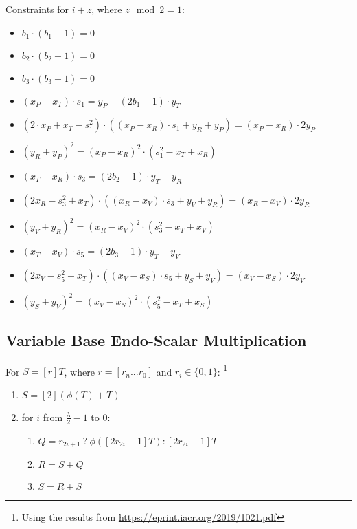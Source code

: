 Constraints for $i + z$, where $z\mod 2 = 1$:
\begin{itemize}
	\item $b_1 \cdot (b_1 - 1) = 0$
	\item $b_2 \cdot (b_2 - 1) = 0$
	\item $b_3 \cdot (b_3 - 1) = 0$
	\item $(x_P - x_T) \cdot s_1 = y_P - (2b_1 - 1) \cdot y_T$
	\item $(2 \cdot x_P + x_T - s_1^2) \cdot ((x_P - x_R) \cdot s_1 + y_R + y_P) = (x_P - x_R) \cdot 2y_P$\
	\item $(y_R + y_P)^2 = (x_P - x_R)^2 \cdot (s_1^2 - x_T + x_R)$
	\item $(x_T - x_R) \cdot s_3 = (2b_2 - 1) \cdot y_T - y_R$
	\item $(2x_R - s_3^2 + x_T) \cdot ((x_R - x_V) \cdot s_3 + y_V + y_R) = (x_R - x_V) \cdot 2y_R$
	\item $(y_V + y_R)^2 = (x_R - x_V)^2 \cdot (s_3^2 - x_T + x_V)$
	\item $(x_T - x_V) \cdot s_5 = (2b_3 - 1) \cdot y_T - y_V$
	\item $(2x_V - s_5^2 + x_T) \cdot ((x_V - x_S) \cdot s_5 + y_S + y_V) = (x_V - x_S) \cdot 2y_V$
	\item $(y_S + y_V)^2 = (x_V - x_S)^2 \cdot (s_5^2 - x_T + x_S)$
\end{itemize}

\subsection{Variable Base Endo-Scalar Multiplication}

For $S  = [r]T$, where $r = [r_n ... r_0]$ and $r_i \in \{0, 1\}$:
\footnote{Using the results from \url{https://eprint.iacr.org/2019/1021.pdf}}
\begin{enumerate}
	\item $S = [2](\phi(T) + T)$
	\item for $i$ from $\frac{\lambda}{2} - 1$ to $0$:
	\begin{enumerate}
		\item $Q = r_{2i + 1} \: ? \: \phi([2r_{2i} - 1]T) : [2r_{2i} - 1]T$
		\item $R = S + Q$
		\item $S = R + S$
	\end{enumerate}
\end{enumerate}

